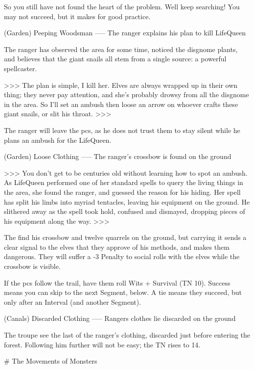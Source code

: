 \begin{speechtext}
  So you still have not found the heart of the problem.
  Well keep searching!
  You may not succeed, but it makes for good practice.
\end{speechtext}

(Garden) Peeping Woodsman
-----
{The ranger explains his plan to kill LifeQueen}

The ranger has observed the area for some time, noticed the disgnome plants, and believes that the giant snails all stem from a single source: a powerful spellcaster.

>>>
The plan is simple, I kill her.
Elves are always wrapped up in their own thing; they never pay attention, and she's probably drowsy from all the disgnome in the area.
So I'll set an ambush then loose an arrow on whoever crafts these giant snails, or slit his throat.
>>>

The ranger will leave the \glspl{pc}, as he does not trust them to stay silent while he plans an ambush for the LifeQueen.

(Garden) Loose Clothing
-----
{The ranger's crossbow is found on the ground}

>>>
You don't get to be centuries old without learning how to spot an ambush.
As LifeQueen performed one of her standard spells to query the living things in the area, she found the ranger, and guessed the reason for his hiding.
Her spell has split his limbs into myriad tentacles, leaving his equipment on the ground.
He slithered away as the spell took hold, confused and dismayed, dropping pieces of his equipment along the way.
>>>

The find his crossbow and twelve quarrels on the ground, but carrying it sends a clear signal to the elves that they approve of his methods, and makes them dangerous.
They will suffer a -3 Penalty to social rolls with the elves while the crossbow is visible.

If the \glspl{pc} follow the trail, have them roll Wits + Survival (TN 10).
Success means you can skip to the next Segment, below.
A tie means they succeed, but only after an Interval (and another Segment).

(Canals) Discarded Clothing
-----
{Rangers clothes lie discarded on the ground}

The troupe see the last of the ranger's clothing, discarded just before entering the forest.
Following him further will not be easy; the TN rises to 14.

# The Movements of Monsters

